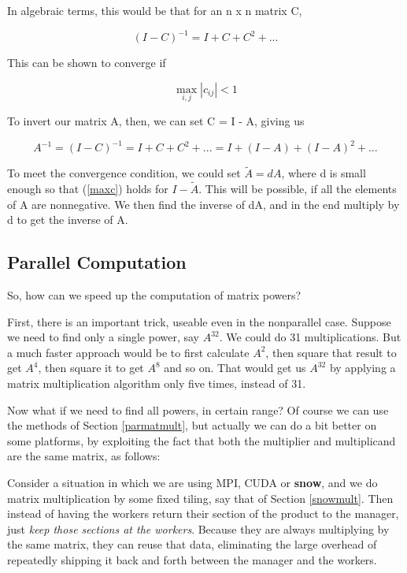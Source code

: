 In algebraic terms, this would be that for an n x n matrix C,

\begin{equation}
(I - C)^{-1} = I + C + C^2 + ...
\end{equation}

This can be shown to converge if 

\begin{equation}
\label{maxc}
\max_{i,j} |c_{ij}| < 1
\end{equation}

To invert our matrix A, then, we can set C = I - A, giving us

\begin{equation}
A^{-1} = (I - C)^{-1} = I + C + C^2 + ... =
I + (I-A) + (I-A)^2 + ... 
\end{equation}

To meet the convergence condition, we could set $\tilde{A} = dA$, where
d is small enough so that (\ref{maxc}) holds for $I - \tilde{A}$.  This
will be possible, if all the elements of A are nonnegative.  We then
find the inverse of dA, and in the end multiply by d to get the inverse
of A.

\subsection{Parallel Computation}

So, how can we speed up the computation of matrix powers?

First, there is an important trick, useable even in the nonparallel
case.  Suppose we need to find only a single power, say $A^{32}$.  We
could do 31 multiplications.  But a much faster approach would be to
first calculate $A^2$, then square that result to get $A^4$, then square
it to get $A^8$ and so on.  That would get us $A^{32}$ by applying a
matrix multiplication algorithm only five times, instead of 31.

Now what if we need to find all powers, in certain range?  Of course we
can use the methods of Section \ref{parmatmult}, but actually we can do
a bit better on some platforms, by exploiting the fact that both the
multiplier and multiplicand are the same matrix, as follows:

Consider a situation in which we are using MPI, CUDA or {\bf snow}, and
we do matrix multiplication by some fixed tiling, say that of Section
\ref{snowmult}.  Then instead of having the workers return their section
of the product to the manager, just {\it keep those sections at the
workers}.  Because they are always multiplying by the same matrix, they
can reuse that data, eliminating the large overhead of repeatedly
shipping it back and forth between the manager and the workers.

